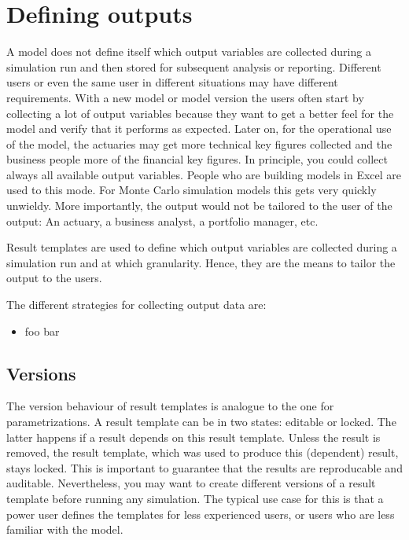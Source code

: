 \section{Defining outputs}
\label{sec:riskAnalyticsResultTemplates}

A model does not define itself which output variables are collected during a simulation run and then stored for subsequent analysis or reporting. Different users or even the same user in different situations may have different requirements. With a new model or model version the users often start by collecting a lot of output variables because they want to get a better feel for the model and verify that it performs as expected. Later on, for the operational use of the model, the actuaries may get more technical key figures collected and the business people more of the financial key figures. In principle, you could collect always all available output variables. People who are building models in Excel are used to this mode. For Monte Carlo simulation models this gets very quickly unwieldy. More importantly, the output would not be tailored to the user of the output: An actuary, a business analyst, a portfolio manager, etc.

Result templates are used to define which output variables are collected during a simulation run and at which granularity. Hence, they are the means to tailor the output to the users. 

The different strategies for collecting output data are:
\begin{itemize}
	\item foo bar
\end{itemize}


\subsection{Versions}
\label{subsec:resultTemplateVersions}

The version behaviour of result templates is analogue to the one for parametrizations.
A result template can be in two states: editable or locked. The latter happens if a result depends on this result template.  Unless the result is removed, the result template, which was used to produce this (dependent) result, stays locked. This is important to guarantee that the results are reproducable and auditable. Nevertheless, you may want to create different versions of a result template before running any simulation. The typical use case for this is that a power user defines the templates for less experienced users, or users who are less familiar with the model.

